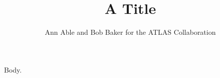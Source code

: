 \documentclass{article}
\begin{document}
\title{A Title}
\author{Ann Able and Bob Baker for the ATLAS Collaboration}
\maketitle
Body.
\end{document}
